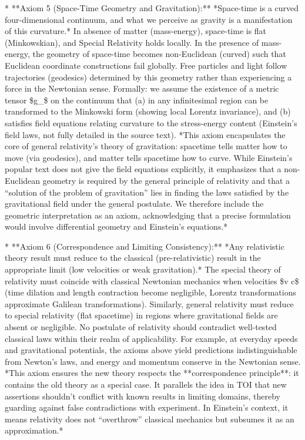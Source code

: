 \documentclass{article}
\begin{document}
* **Axiom 5 (Space-Time Geometry and Gravitation):** *Space-time is a curved four-dimensional continuum, and what we perceive as gravity is a manifestation of this curvature.* In absence of matter (mass-energy), space-time is flat (Minkowskian), and Special Relativity holds locally. In the presence of mass-energy, the geometry of space-time becomes non-Euclidean (curved) such that Euclidean coordinate constructions fail globally. Free particles and light follow trajectories (geodesics) determined by this geometry rather than experiencing a force in the Newtonian sense. Formally: we assume the existence of a metric tensor \$g\_{\mu\nu}\$ on the continuum that (a) in any infinitesimal region can be transformed to the Minkowski form (showing local Lorentz invariance), and (b) satisfies field equations relating curvature to the stress-energy content (Einstein’s field laws, not fully detailed in the source text). *This axiom encapsulates the core of general relativity’s theory of gravitation: spacetime tells matter how to move (via geodesics), and matter tells spacetime how to curve. While Einstein’s popular text does not give the field equations explicitly, it emphasizes that a non-Euclidean geometry is required by the general principle of relativity and that a “solution of the problem of gravitation” lies in finding the laws satisfied by the gravitational field under the general postulate. We therefore include the geometric interpretation as an axiom, acknowledging that a precise formulation would involve differential geometry and Einstein’s equations.*

* **Axiom 6 (Correspondence and Limiting Consistency):** *Any relativistic theory result must reduce to the classical (pre-relativistic) result in the appropriate limit (low velocities or weak gravitation).* The special theory of relativity must coincide with classical Newtonian mechanics when velocities \$v \ll c\$ (time dilation and length contraction become negligible, Lorentz transformations approximate Galilean transformations). Similarly, general relativity must reduce to special relativity (flat spacetime) in regions where gravitational fields are absent or negligible. No postulate of relativity should contradict well-tested classical laws within their realm of applicability. For example, at everyday speeds and gravitational potentials, the axioms above yield predictions indistinguishable from Newton’s laws, and energy and momentum conserve in the Newtonian sense. *This axiom ensures the new theory respects the **correspondence principle**: it contains the old theory as a special case. It parallels the idea in TOI that new assertions shouldn’t conflict with known results in limiting domains, thereby guarding against false contradictions with experiment. In Einstein’s context, it means relativity does not “overthrow” classical mechanics but subsumes it as an approximation.*
\end{document}
